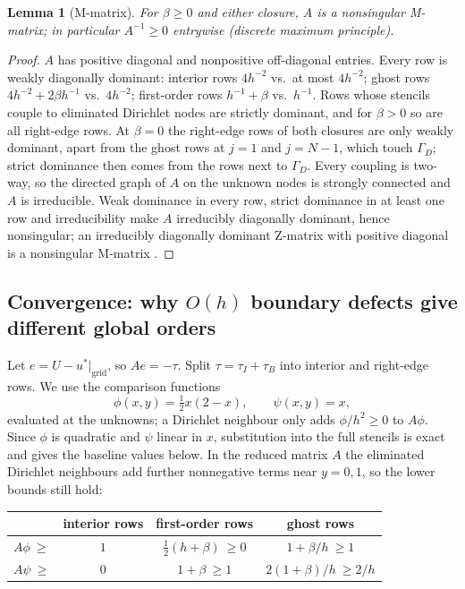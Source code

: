 \documentclass[11pt,a4paper]{article}
\theoremstyle{palplain}
\newtheorem{lemma}[theorem]{Lemma}
\theoremstyle{paldef}
\theoremstyle{palremark}
\newcommand{\GD}{\Gamma_D}
\begin{document}
\begin{lemma}[M-matrix]\label{lem:M}
For $\beta\ge0$ and either closure, $A$ is a nonsingular M-matrix; in particular $A^{-1}\ge0$
entrywise (discrete maximum principle).
\end{lemma}
\begin{proof}
$A$ has positive diagonal and nonpositive off-diagonal entries. Every row is weakly
diagonally dominant: interior rows $4h^{-2}$ vs.\ at most $4h^{-2}$; ghost rows
$4h^{-2}+2\beta h^{-1}$ vs.\ $4h^{-2}$; first-order rows $h^{-1}+\beta$ vs.\ $h^{-1}$.
Rows whose stencils couple to eliminated Dirichlet nodes are strictly dominant, and for
$\beta>0$ so are all right-edge rows. At $\beta=0$ the right-edge rows of both closures are only
weakly dominant, apart from the ghost rows at $j=1$ and $j=N-1$, which touch $\GD$; strict
dominance then comes from the rows next to $\GD$. Every coupling is two-way, so the directed graph of
$A$ on the unknown nodes is strongly connected and $A$ is irreducible. Weak dominance in
every row, strict dominance in at least one row and irreducibility make $A$ irreducibly
diagonally dominant, hence nonsingular; an irreducibly diagonally dominant Z-matrix with
positive diagonal is a nonsingular M-matrix \cite{varga}.
\end{proof}

\subsection{Convergence: why \texorpdfstring{$O(h)$}{O(h)} boundary defects give different global orders}
Let $e=U-u^*|_{\text{grid}}$, so $Ae=-\tau$. Split $\tau=\tau_I+\tau_B$ into interior and
right-edge rows. We use the comparison functions
\[
\phi(x,y)=\tfrac12x(2-x),\qquad \psi(x,y)=x ,
\]
evaluated at the unknowns; a Dirichlet neighbour only adds $\phi/h^2\ge0$ to $A\phi$.
Since $\phi$ is quadratic and $\psi$ linear in $x$, substitution into the full stencils is
exact and gives the baseline values below. In the reduced matrix $A$ the eliminated Dirichlet
neighbours add further nonnegative terms near $y=0,1$, so the lower bounds still hold:
\begin{center}\small
\begin{tabular}{@{}lccc@{}}\toprule
& interior rows & first-order rows & ghost rows\\\midrule
$A\phi\ \ge$ & $1$ & $\tfrac12(h+\beta)\ \ge0$ & $1+\beta/h\ \ge 1$\\
$A\psi\ \ge$ & $0$ & $1+\beta\ \ge 1$ & $2(1+\beta)/h\ \ge 2/h$\\\bottomrule
\end{tabular}
\end{center}
\end{document}
